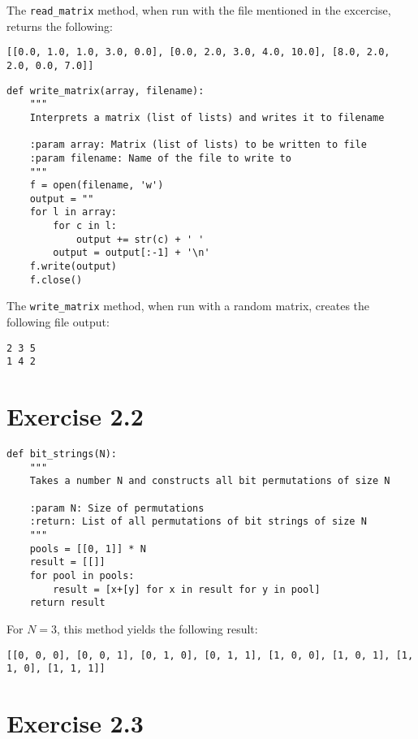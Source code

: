 \documentclass{article}
\begin{document}
The \texttt{read\_matrix} method, when run with the file mentioned in the excercise, returns the following:

\begin{lstlisting}
[[0.0, 1.0, 1.0, 3.0, 0.0], [0.0, 2.0, 3.0, 4.0, 10.0], [8.0, 2.0, 2.0, 0.0, 7.0]]
\end{lstlisting}

\begin{lstlisting}
def write_matrix(array, filename):
    """
    Interprets a matrix (list of lists) and writes it to filename

    :param array: Matrix (list of lists) to be written to file
    :param filename: Name of the file to write to
    """
    f = open(filename, 'w')
    output = ""
    for l in array:
        for c in l:
            output += str(c) + ' '
        output = output[:-1] + '\n'
    f.write(output)
    f.close()
\end{lstlisting}

The \texttt{write\_matrix} method, when run with a random matrix, creates the following file output:

\begin{lstlisting}
2 3 5
1 4 2
\end{lstlisting}

\section{Exercise 2.2}

\begin{lstlisting}
def bit_strings(N):
    """
    Takes a number N and constructs all bit permutations of size N

    :param N: Size of permutations
    :return: List of all permutations of bit strings of size N
    """
    pools = [[0, 1]] * N
    result = [[]]
    for pool in pools:
        result = [x+[y] for x in result for y in pool]
    return result
\end{lstlisting}

For $N = 3$, this method yields the following result:

\begin{lstlisting}
[[0, 0, 0], [0, 0, 1], [0, 1, 0], [0, 1, 1], [1, 0, 0], [1, 0, 1], [1, 1, 0], [1, 1, 1]]
\end{lstlisting}

\section{Exercise 2.3}
\end{document}
